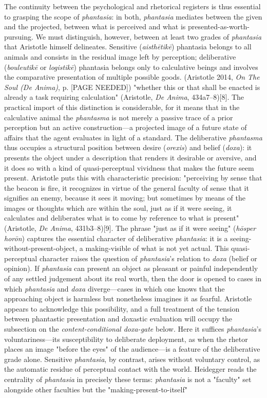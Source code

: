 \documentclass{article}
\begin{document}
The continuity between the psychological and rhetorical registers is thus essential to grasping the scope of \textit{phantasia}: in both, \textit{phantasia} mediates between the given and the projected, between what is perceived and what is presented-as-worth-pursuing. We must distinguish, however, between at least two grades of \textit{phantasia} that Aristotle himself delineates. Sensitive (\textit{aisthētikē}) phantasia belongs to all animals and consists in the residual image left by perception; deliberative (\textit{bouleutikē} or \textit{logistikē}) phantasia belongs only to calculative beings and involves the comparative presentation of multiple possible goods. (Aristotle 2014, \textit{On The Soul (De Anima)}, p. [PAGE NEEDED]) "whether this or that shall be enacted is already a task requiring calculation" (Aristotle, \textit{De Anima}, 434a7--8)[8]. The practical import of this distinction is considerable, for it means that in the calculative animal the \textit{phantasma} is not merely a passive trace of a prior perception but an active construction---a projected image of a future state of affairs that the agent evaluates in light of a standard. The deliberative \textit{phantasma} thus occupies a structural position between desire (\textit{orexis}) and belief (\textit{doxa}): it presents the object under a description that renders it desirable or aversive, and it does so with a kind of quasi-perceptual vividness that makes the future seem present. Aristotle puts this with characteristic precision: "perceiving by sense that the beacon is fire, it recognizes in virtue of the general faculty of sense that it signifies an enemy, because it sees it moving; but sometimes by means of the images or thoughts which are within the soul, just as if it were seeing, it calculates and deliberates what is to come by reference to what is present" (Aristotle, \textit{De Anima}, 431b3--8)[9]. The phrase "just as if it were seeing" (\textit{hōsper horōn}) captures the essential character of deliberative \textit{phantasia}: it is a seeing-without-present-object, a making-visible of what is not yet actual. This quasi-perceptual character raises the question of \textit{phantasia}'s relation to \textit{doxa} (belief or opinion). If \textit{phantasia} can present an object as pleasant or painful independently of any settled judgement about its real worth, then the door is opened to cases in which \textit{phantasia} and \textit{doxa} diverge---cases in which one knows that the approaching object is harmless but nonetheless imagines it as fearful. Aristotle appears to acknowledge this possibility, and a full treatment of the tension between phantastic presentation and doxastic evaluation will occupy the subsection on the \textit{content-conditional doxa-gate} below. Here it suffices \textit{phantasia}'s voluntariness---its susceptibility to deliberate deployment, as when the rhetor places an image "before the eyes" of the audience---is a feature of the deliberative grade alone. Sensitive \textit{phantasia}, by contrast, arises without voluntary control, as the automatic residue of perceptual contact with the world. Heidegger reads the centrality of \textit{phantasia} in precisely these terms: \textit{phantasia} is not a "faculty" set alongside other faculties but the "making-present-to-itself" 
\end{document}
